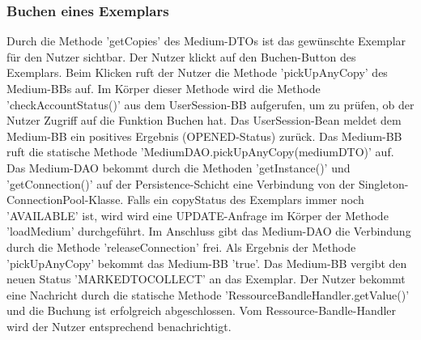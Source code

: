 \documentclass{article}
\begin{document}
\subsubsection{Buchen eines Exemplars}
Durch die Methode 'getCopies' des Medium-DTOs ist das gewünschte Exemplar für den Nutzer sichtbar. Der Nutzer klickt auf den Buchen-Button des Exemplars. Beim Klicken ruft der Nutzer die Methode 'pickUpAnyCopy' des Medium-BBs auf. Im Körper dieser Methode wird die Methode 'checkAccountStatus()' aus dem UserSession-BB aufgerufen, um zu prüfen, ob der Nutzer Zugriff auf die Funktion Buchen hat. Das UserSession-Bean meldet dem Medium-BB ein positives Ergebnis (OPENED-Status) zurück. Das Medium-BB ruft die statische Methode 'MediumDAO.pickUpAnyCopy(mediumDTO)' auf. Das Medium-DAO bekommt durch die Methoden 'getInstance()' und 'getConnection()' auf der Persistence-Schicht eine Verbindung von der Singleton-ConnectionPool-Klasse. Falls ein copyStatus des Exemplars immer noch 'AVAILABLE' ist, wird wird eine UPDATE-Anfrage im Körper der Methode 'loadMedium'  durchgeführt. Im Anschluss gibt das Medium-DAO die Verbindung durch die Methode 'releaseConnection' frei. Als Ergebnis der Methode 'pickUpAnyCopy' bekommt das Medium-BB 'true'. Das Medium-BB vergibt den neuen Status 'MARKEDTOCOLLECT' an das Exemplar. Der Nutzer bekommt eine Nachricht durch die statische Methode 'RessourceBandleHandler.getValue()' und die Buchung ist erfolgreich abgeschlossen. Vom Ressource-Bandle-Handler wird der Nutzer entsprechend benachrichtigt.
\newpage
\end{document}
